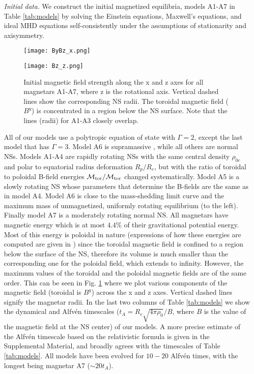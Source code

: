 \documentclass[twocolumn,superscriptaddress,showpacs,prl,aps,amsmath,amssymb,nofootinbib]{revtex4-1}
\begin{document}
\textit{Initial data.}\textemdash 
We construct the initial magnetized equilibria, models A1-A7 in Table
\ref{tab:models} by solving the Einstein equations, Maxwell's
equations, and ideal MHD equations self-consistently under the
assumptions of stationarity and axisymmetry. 
%
\begin{figure} 
\begin{center}
\texttt{[image: ByBz\_x.png]}

\vspace{-0.1cm}

\texttt{[image: Bz\_z.png]}
\caption{Initial magnetic field strength along the x and z axes for all magnetars A1-A7,
where z is the rotational axis.
Vertical dashed lines show the corresponding NS radii. The toroidal magnetic field ($B^y$) is
concentrated in a region below the NS surface. Note that the lines (radii) for A1-A3 closely
overlap.}
\label{fig:B0}
\end{center}
\end{figure}
%
All of our models use a polytropic equation of state with $\Gamma=2$, except
the last model that has $\Gamma=3$. Model A6 is supramassive \cite{Cook:1993qj},
while all others are normal NSs. Models A1-A4 are rapidly rotating NSs with the
same central density $\rho_{0c}$ and polar to equatorial radius deformation $R_p/R_e$, but with the ratio
of toroidal to poloidal B-field energies $\mathcal{M}_{\rm
tor}/\mathcal{M}_{\rm tor}$ changed systematically.  Model A5 is a slowly
rotating NS whose parameters that determine the B-fields are the same as in
model A4.  Model A6 is close to the mass-shedding limit curve and the maximum
mass of unmagnetized, uniformly rotating equilibrium (to the left).  Finally
model A7 is a moderately rotating normal NS. All magnetars have magnetic energy
which is at most $4.4\%$ of their gravitational potential energy. Most of this
energy is poloidal in nature (expressions of how these energies are computed
are given in \cite{Uryu:2019ckz}) since the toroidal magnetic field is confined
to a region below the surface of the NS, therefore its volume is much
smaller than the corresponding one for the poloidal field, which extends to
infinity. However, the maximum values of the toroidal and the poloidal
magnetic fields are of the same order. This can be seen in Fig. \ref{fig:B0}
where we plot various components of the magnetic field (toroidal is $B^y$)
across the x and z axes. Vertical dashed lines signify the magnetar radii. In
the last two columns of Table \ref{tab:models} we show the dynamical and
Alfv\'en timescales ($t_A = R_e \sqrt{4\pi\rho_0}/B$, where $B$ is the value of the
magnetic field at the NS center) of our models. A more precise estimate of the
Alfv\'en timescale based on the relativistic formula is given in the
Supplemental Material, and broadly agrees with the timescales of  Table
\ref{tab:models}. All models have been evolved for $10-20$ Alfv\'en
times, with the longest being magnetar A7 ($\sim 20 t_A$).
\end{document}
